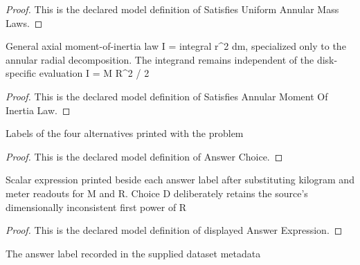 \begin{proof}
  This is the declared model definition of Satisfies Uniform Annular Mass Laws.
\end{proof}
\begin{definition}
  \label{def:physics:phyx-mini-0700:phyxminiproblems-problemphyxmini0700-satisfiesannularmomentofinertialaw}
  General axial moment-of-inertia law I = integral r\textasciicircum{}2 dm, specialized only to the annular radial decomposition. The integrand remains independent of the disk-specific evaluation I = M R\textasciicircum{}2 / 2
\end{definition}
\begin{proof}
  This is the declared model definition of Satisfies Annular Moment Of Inertia Law.
\end{proof}
\begin{definition}
  \label{def:physics:phyx-mini-0700:phyxminiproblems-problemphyxmini0700-answerchoice}
  Labels of the four alternatives printed with the problem
\end{definition}
\begin{proof}
  This is the declared model definition of Answer Choice.
\end{proof}
\begin{definition}
  \label{def:physics:phyx-mini-0700:phyxminiproblems-problemphyxmini0700-displayedanswerexpression}
  Scalar expression printed beside each answer label after substituting kilogram and meter readouts for M and R. Choice D deliberately retains the source's dimensionally inconsistent first power of R
\end{definition}
\begin{proof}
  This is the declared model definition of displayed Answer Expression.
\end{proof}
\begin{definition}
  \label{def:physics:phyx-mini-0700:phyxminiproblems-problemphyxmini0700-recordedanswerchoice}
  The answer label recorded in the supplied dataset metadata
\end{definition}
